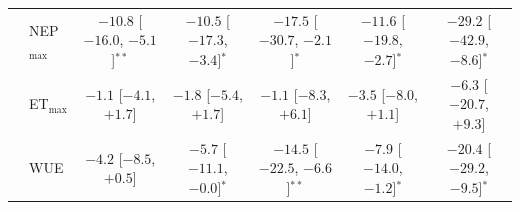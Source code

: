\begin{table}[htbp]
{\begin{tabular}{llccccc}
 & NEP$_\mathrm{max}$ & $-10.8$ {\tiny[$-16.0$, $-5.1$]}$^{**}$ & $-10.5$ {\tiny[$-17.3$, $-3.4$]}$^{*}$ & $-17.5$ {\tiny[$-30.7$, $-2.1$]}$^{*}$ & $-11.6$ {\tiny[$-19.8$, $-2.7$]}$^{*}$ & $-29.2$ {\tiny[$-42.9$, $-8.6$]}$^{*}$ \\
 & ET$_\mathrm{max}$ & $-1.1$ {\tiny[$-4.1$, $+1.7$]} & $-1.8$ {\tiny[$-5.4$, $+1.7$]} & $-1.1$ {\tiny[$-8.3$, $+6.1$]} & $-3.5$ {\tiny[$-8.0$, $+1.1$]} & $-6.3$ {\tiny[$-20.7$, $+9.3$]} \\
 & WUE & $-4.2$ {\tiny[$-8.5$, $+0.5$]} & $-5.7$ {\tiny[$-11.1$, $-0.0$]}$^{*}$ & $-14.5$ {\tiny[$-22.5$, $-6.6$]}$^{**}$ & $-7.9$ {\tiny[$-14.0$, $-1.2$]}$^{*}$ & $-20.4$ {\tiny[$-29.2$, $-9.5$]}$^{*}$ \\
\bottomrule
\end{tabular}}
\end{table}
